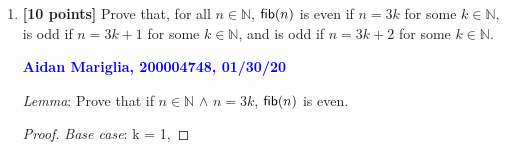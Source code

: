 \documentclass[11pt,fleqn]{article}
\newcommand{\mname}[1]{\mbox{\sf #1}}
\begin{document}
\begin{enumerate}
  \bigskip

  \item \textbf{[10 points]} Prove that, for all $n \in \mathbb{N}$,
    $\mname{fib}(n)$ is even if $n = 3k$ for some $k \in \mathbb{N}$,
    is odd if $n = 3k + 1$ for some $k \in \mathbb{N}$, and is odd if
    $n = 3k + 2$ for some $k \in \mathbb{N}$.

  \bigskip

  \textcolor{blue}{\textbf{Aidan Mariglia, 200004748, 01/30/20}}

  \emph{Lemma}: Prove that if $n \in \mathbb{N}$ $\land$ $ n = 3k$, $ \mname{fib}(n) $
  is even.

  \begin{proof}
  \emph{Base case}: k = 1, 
  
  \end{proof}

\end{enumerate}
\end{document}
